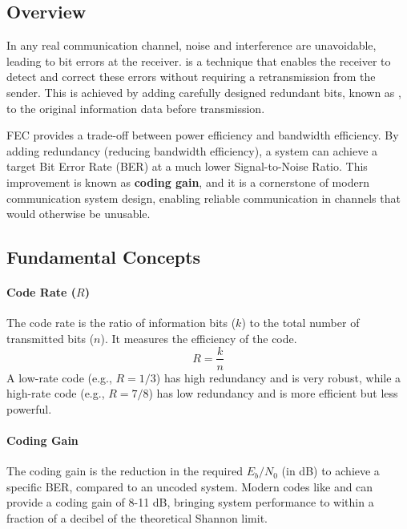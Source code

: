 \subsection{Overview}

In any real communication channel, noise and interference are unavoidable, leading to bit errors at the receiver.  is a technique that enables the receiver to detect and correct these errors without requiring a retransmission from the sender. This is achieved by adding carefully designed redundant bits, known as , to the original information data before transmission.

\begin{keyconcept}
    FEC provides a trade-off between power efficiency and bandwidth efficiency. By adding redundancy (reducing bandwidth efficiency), a system can achieve a target Bit Error Rate (BER) at a much lower Signal-to-Noise Ratio. This improvement is known as \textbf{coding gain}, and it is a cornerstone of modern communication system design, enabling reliable communication in channels that would otherwise be unusable.
\end{keyconcept}


\subsection{Fundamental Concepts}

\paragraph{Code Rate ($R$)}
The code rate is the ratio of information bits ($k$) to the total number of transmitted bits ($n$). It measures the efficiency of the code.
\begin{equation}
    R = \frac{k}{n}
\end{equation}
A low-rate code (e.g., $R=1/3$) has high redundancy and is very robust, while a high-rate code (e.g., $R=7/8$) has low redundancy and is more efficient but less powerful.

\paragraph{Coding Gain}
The coding gain is the reduction in the required $E_b/N_0$ (in dB) to achieve a specific BER, compared to an uncoded system. Modern codes like  and  can provide a coding gain of 8-11 dB, bringing system performance to within a fraction of a decibel of the theoretical Shannon limit.


